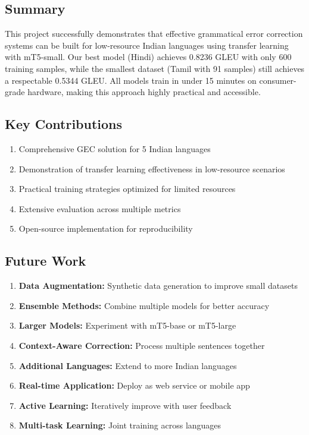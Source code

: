 \documentclass[12pt,a4paper]{article}
\begin{document}
\subsection{Summary}
This project successfully demonstrates that effective grammatical error correction systems can be built for low-resource Indian languages using transfer learning with mT5-small. Our best model (Hindi) achieves 0.8236 GLEU with only 600 training samples, while the smallest dataset (Tamil with 91 samples) still achieves a respectable 0.5344 GLEU. All models train in under 15 minutes on consumer-grade hardware, making this approach highly practical and accessible.

\subsection{Key Contributions}
\begin{enumerate}
    \item Comprehensive GEC solution for 5 Indian languages
    \item Demonstration of transfer learning effectiveness in low-resource scenarios
    \item Practical training strategies optimized for limited resources
    \item Extensive evaluation across multiple metrics
    \item Open-source implementation for reproducibility
\end{enumerate}

\subsection{Future Work}
\begin{enumerate}
    \item \textbf{Data Augmentation:} Synthetic data generation to improve small datasets
    \item \textbf{Ensemble Methods:} Combine multiple models for better accuracy
    \item \textbf{Larger Models:} Experiment with mT5-base or mT5-large
    \item \textbf{Context-Aware Correction:} Process multiple sentences together
    \item \textbf{Additional Languages:} Extend to more Indian languages
    \item \textbf{Real-time Application:} Deploy as web service or mobile app
    \item \textbf{Active Learning:} Iteratively improve with user feedback
    \item \textbf{Multi-task Learning:} Joint training across languages
\end{enumerate}
\end{document}
